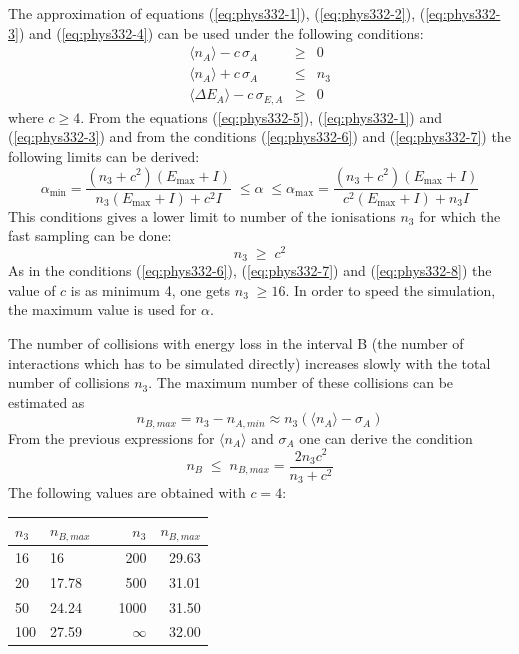 \documentclass{article}
\newcommand{\Emax}{\ensuremath{E_{\mathrm{max}}}}
\begin{document}
The approximation of equations (\ref{eq:phys332-1}),
(\ref{eq:phys332-2}), (\ref{eq:phys332-3}) and (\ref{eq:phys332-4})
can be used under the following conditions:
\begin{eqnarray}
\label{eq:phys332-6}
\langle n_A \rangle - c \, \sigma_A            & \geq & 0 \\
\label{eq:phys332-7}
\langle n_A \rangle + c \, \sigma_A            & \leq & n_3 \\
\label{eq:phys332-8}
\langle \Delta E_A \rangle - c \, \sigma_{E,A} & \geq & 0
\end{eqnarray}
where $c \geq 4$. From the equations (\ref{eq:phys332-5}),
(\ref{eq:phys332-1}) and (\ref{eq:phys332-3}) and from the conditions
(\ref{eq:phys332-6}) and (\ref{eq:phys332-7}) the following limits can
be derived:
\begin{equation}
\alpha_{\mathrm{min}} = \frac{(n_3 + c^2)(\Emax+I)}
                      {n_3 (\Emax + I) + c^2 I} \; \leq \alpha \; \leq
\alpha_{\mathrm{max}} = \frac{(n_3 + c^2)(\Emax+I)}
                      {c^2 (\Emax + I) + n_3 I}
\end{equation}
This conditions gives a lower limit to number of the ionisations $n_3$
for which the fast sampling can be done:
\begin{equation}
n_3 \; \geq \; c^2
\end{equation}
As in the conditions (\ref{eq:phys332-6}), (\ref{eq:phys332-7}) and
(\ref{eq:phys332-8}) the value of $c$ is as minimum 4, one gets $n_3
\; \geq 16$. In order to speed the simulation, the maximum value is
used for $\alpha$.

The number of collisions with energy loss in the interval B (the
number of interactions which has to be simulated directly) increases
slowly with the total number of collisions $n_3$. The maximum number
of these collisions can be estimated as
\begin{equation}
n_{B,max} = n_3 - n_{A,min} \approx n_3 (\langle n_A \rangle 
            - \sigma_A)
\end{equation}
From the previous expressions for $\langle n_A \rangle$ and $\sigma_A$
one can derive the condition
\begin{equation}
n_B \; \leq \; n_{B,max} = \frac{2 n_3 c^2}{n_3+c^2}
\end{equation}
The following values are obtained with $c=4$:

\begin{tabular}{llcrr}
$n_3$  & $n_{B,max}$ & & $n_3$  & $n_{B,max}$\\ \hline
16   & 16      & & 200  & 29.63\\
20   & 17.78   & & 500  & 31.01 \\
50   & 24.24   & & 1000 & 31.50 \\
100  & 27.59   & & $\infty$ & 32.00
\end{tabular}
\end{document}
